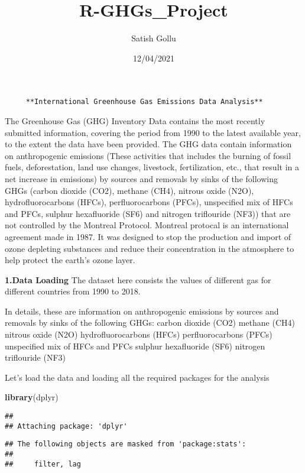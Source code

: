 \documentclass[
]{article}
\title{R-GHGs\_Project}
\author{Satish Gollu}
\date{12/04/2021}
\newenvironment{Shaded}{\begin{snugshade}}{\end{snugshade}}
\newcommand{\KeywordTok}[1]{\textcolor[rgb]{0.13,0.29,0.53}{\textbf{#1}}}
\newcommand{\NormalTok}[1]{#1}
\begin{document}
\maketitle

\begin{verbatim}
     **International Greenhouse Gas Emissions Data Analysis**
\end{verbatim}

The Greenhouse Gas (GHG) Inventory Data contains the most recently
submitted information, covering the period from 1990 to the latest
available year, to the extent the data have been provided. The GHG data
contain information on anthropogenic emissions (These activities that
includes the burning of fossil fuels, deforestation, land use changes,
livestock, fertilization, etc., that result in a net increase in
emissions) by sources and removals by sinks of the following GHGs
(carbon dioxide (CO2), methane (CH4), nitrous oxide (N2O),
hydrofluorocarbons (HFCs), perfluorocarbons (PFCs), unspecified mix of
HFCs and PFCs, sulphur hexafluoride (SF6) and nitrogen triflouride
(NF3)) that are not controlled by the Montreal Protocol. Montreal
protocal is an international agreement made in 1987. It was designed to
stop the production and import of ozone depleting substances and reduce
their concentration in the atmosphere to help protect the earth's ozone
layer.

\textbf{1.Data Loading} The dataset here consists the values of
different gas for different countries from 1990 to 2018.

In details, these are information on anthropogenic emissions by sources
and removals by sinks of the following GHGs: carbon dioxide (CO2)
methane (CH4) nitrous oxide (N2O) hydrofluorocarbons (HFCs)
perfluorocarbons (PFCs) unspecified mix of HFCs and PFCs sulphur
hexafluoride (SF6) nitrogen triflouride (NF3)

Let's load the data and loading all the required packages for the
analysis

\begin{Shaded}
\begin{Highlighting}[]
\KeywordTok{library}\NormalTok{(dplyr)}
\end{Highlighting}
\end{Shaded}

\begin{verbatim}
## 
## Attaching package: 'dplyr'
\end{verbatim}

\begin{verbatim}
## The following objects are masked from 'package:stats':
## 
##     filter, lag
\end{verbatim}
\end{document}
